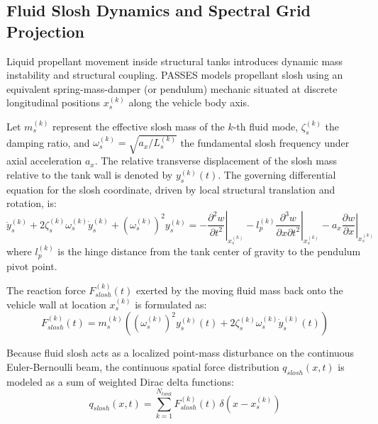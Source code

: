 \documentclass[11pt,a4paper]{article}
\theoremstyle{definition}
\numberwithin{equation}{section}
\begin{document}
\subsection{Fluid Slosh Dynamics and Spectral Grid Projection}

Liquid propellant movement inside structural tanks introduces dynamic mass instability and structural coupling. PASSES models propellant slosh using an equivalent spring-mass-damper (or pendulum) mechanic situated at discrete longitudinal positions $x_s^{(k)}$ along the vehicle body axis. 

Let $m_s^{(k)}$ represent the effective slosh mass of the $k$-th fluid mode, $\zeta_s^{(k)}$ the damping ratio, and $\omega_s^{(k)} = \sqrt{a_x / L_s^{(k)}}$ the fundamental slosh frequency under axial acceleration $a_x$. The relative transverse displacement of the slosh mass relative to the tank wall is denoted by $y_s^{(k)}(t)$. The governing differential equation for the slosh coordinate, driven by local structural translation and rotation, is:
\begin{equation}
    \ddot{y}_s^{(k)} + 2 \zeta_s^{(k)} \omega_s^{(k)} \dot{y}_s^{(k)} + \left(\omega_s^{(k)}\right)^2 y_s^{(k)} = - \left. \frac{\partial^2 w}{\partial t^2} \right|_{x_s^{(k)}} - l_p^{(k)} \left. \frac{\partial^3 w}{\partial x \partial t^2} \right|_{x_s^{(k)}} - a_x \left. \frac{\partial w}{\partial x} \right|_{x_s^{(k)}}
\end{equation}
where $l_p^{(k)}$ is the hinge distance from the tank center of gravity to the pendulum pivot point.

The reaction force $F_{slosh}^{(k)}(t)$ exerted by the moving fluid mass back onto the vehicle wall at location $x_s^{(k)}$ is formulated as:
\begin{equation}
    F_{slosh}^{(k)}(t) = m_s^{(k)} \left( \left(\omega_s^{(k)}\right)^2 y_s^{(k)}(t) + 2 \zeta_s^{(k)} \omega_s^{(k)} \dot{y}_s^{(k)}(t) \right)
\end{equation}

Because fluid slosh acts as a localized point-mass disturbance on the continuous Euler-Bernoulli beam, the continuous spatial force distribution $q_{slosh}(x, t)$ is modeled as a sum of weighted Dirac delta functions:
\begin{equation}
    q_{slosh}(x, t) = \sum_{k=1}^{N_{tank}} F_{slosh}^{(k)}(t) \, \delta\left(x - x_s^{(k)}\right)
\end{equation}
\end{document}
